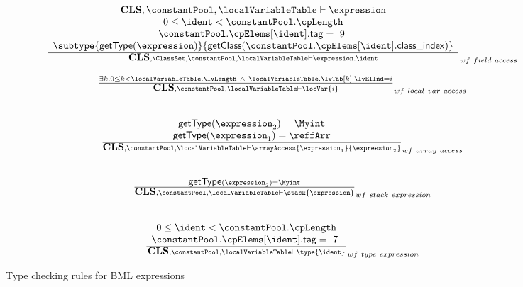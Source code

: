 \begin{figure}
$$\begin{array}{c}
  \frac{ \begin{array}{c}
         \application, \constantPool ,\localVariableTable   \vdash   \expression \\
	   0 \le \ident < \constantPool.\cpLength  \\
	   \constantPool.\cpElems[\ident].\mbox{\rm\textsf{tag}}  = \mbox{ \rm 9 } \\
	   \subtype{ \getType( \expression ) }{  \getClass ( \constantPool .\cpElems[\ident] . \mbox{\rm\textsf{class\_index}} )} \\
	 \end{array} 
  } {\application, \ClassSet, \constantPool , \localVariableTable \vdash \expression.\ident  }_{wf \ field \ access}
\\\\
\frac{ \exists k .  0 \le k <  \localVariableTable. \lvLength \  \wedge \   \localVariableTable. \lvTab [k]. \lvElInd = i  }{\application, \constantPool , \localVariableTable \vdash \locVar{i} }_{wf \ local \ var \ access} \\
\\\\
\frac{\begin{array}{c} 
             \getType ( \expression_2 ) = \Myint \\
	    \getType ( \expression_1 ) =  \reffArr \\
       \end{array}  }{\application,  \constantPool , \localVariableTable \vdash \arrayAccess{\expression_1} {\expression_2}   }_{wf \ array \ access} \\

\\\\
\frac{  \getType ( \expression_2 ) = \Myint   }{\application,  \constantPool , \localVariableTable \vdash \stack{\expression}  }_{wf \ stack \ expression} \\

\\\\
\frac{ 
\begin{array}{c}
	   0 \le \ident < \constantPool.\cpLength  \\
	   \constantPool.\cpElems[\ident].\mbox{\rm\textsf{tag}}  = \mbox{ \rm 7 }
\end{array}
}{\application,  \constantPool , \localVariableTable \vdash \type{\ident}  }_{wf \ type \ expression} \\

\end{array}
$$
\caption{\sc Type checking rules for BML expressions}
\label{typeCheck}
\end{figure}

